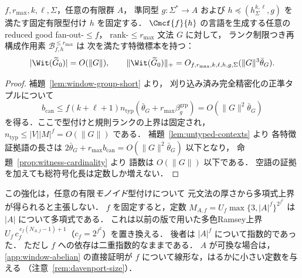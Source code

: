 \begin{theorem}[窓と任意有限群による型付けの多項式特徴データ]
\label{thm:window-group-polydata}
$f,r_{\max},k,\ell,\Sigma$，任意の有限群 $A$，
準同型 $g:\Sigma^*\to A$ および
$h\preceq(h_\Sigma^{k,\ell},g)$ を満たす固定有限型付け
$h$ を固定する．
$\Cmcf{f}{h}$ の言語を生成する任意の
reduced good fan-out-$\le f$，
rank-$\le r_{\max}$ 文法 $G$ に対して，
ランク制限つき再構成作用素
$\mathcal B^{\le r_{\max}}_{f,h}$ は
次を満たす特徴標本を持つ：
\[
 |\Wit(\widetilde G_0)|=O(\|G\|),\qquad
 \|\Wit(\widetilde G_0)\|_+
 =O_{f,r_{\max},k,\ell,h,g,\Sigma}
   (\|G\|^3\bar\theta_G).
\]
\end{theorem}
\begin{proof}
補題~\ref{lem:window-group-short} より，
刈り込み済み完全精密化の正準タプルについて
\[
 b_{\mathrm{can}}\le
 f(k+\ell+1)n_{\mathrm{typ}}
 (\bar\theta_G+r_{\max}\beta_g^{\mathrm{grp}})
 =O(\|G\|^2\bar\theta_G)
\]
を得る．ここで型付けと規則ランクの上界は固定され，
$n_{\mathrm{typ}}\le|V||M|^f=O(\|G\|)$ である．
補題~\ref{lem:untyped-contexts} より
各特徴証拠語の長さは
$2\bar\theta_G+r_{\max}b_{\mathrm{can}}
=O(\|G\|^2\bar\theta_G)$ 以下となり，
命題~\ref{prop:witness-cardinality} より
語数は $O(\|G\|)$ 以下である．
空語の証拠を加えても総符号化長は定数しか増えない．
\end{proof}

\begin{remark}
この強化は，任意の有限\emph{モノイド}型付けについて
元文法の厚さから多項式上界が得られると主張しない．
$f$ を固定すると，定数
$M_{A,f}=U_f\max\{3,|A|^f\}^{2^{f^2}}$ は $|A|$ について多項式である．
これは以前の版で用いた多色Ramsey上界
$U_f\,c_f^{\,c_f(N_{A,f}-1)+1}$（$c_f=2^{f^2}$）を置き換える．
後者は $|A|^f$ について指数的であった．
ただし $f$ への依存は二重指数的なままである．
$A$ が可換な場合は，\ref{app:window-abelian} の直接証明が
$f$ について線形な，はるかに小さい定数を与える
（注意~\ref{rem:davenport-size}）．
\end{remark}
